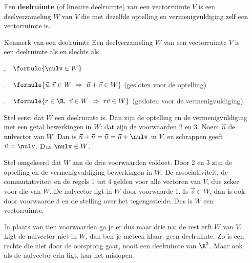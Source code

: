 \begin{theorie}
Een \textbf{\textcolor{accent}{deelruimte}} (of lineaire deelruimte) van een vectorruimte $V$ is een deelverzameling $W$ van $V$ die met dezelfde optelling en vermenigvuldiging zelf een vectorruimte is.

\begin{stelling}{Kenmerk van een deelruimte}
Een deelverzameling $W$ van een vectorruimte $V$ is een deelruimte als en slechts als

\vspace{1mm}
.\ \ $\formule{\nulv \in W}$

.\ \ $\formule{\vec u, \vec v \in W \ \Rightarrow \ \vec u + \vec v \in W}$ \hfill (gesloten voor de optelling)

.\ \ $\formule{r \in \R,\ \vec v \in W \ \Rightarrow \ r\vec v \in W}$ \hfill (gesloten voor de vermenigvuldiging)
\end{stelling}

\begin{bewijs}
Stel eerst dat $W$ een deelruimte is. Dan zijn de optelling en de vermenigvuldiging met een getal bewerkingen in $W$: dat zijn de voorwaarden 2 en 3. Noem $\vec n$ de nulvector van $W$. Dan is $\vec n + \vec n = \vec n = \vec n + \nulv$ in $V$, en schrappen geeft $\vec n = \nulv$. Dus $\nulv \in W$.

Stel omgekeerd dat $W$ aan de drie voorwaarden voldoet. Door 2 en 3 zijn de optelling en de vermenigvuldiging bewerkingen in $W$. De associativiteit, de commutativiteit en de regels 1 tot 4 gelden voor alle vectoren van $V$, dus zeker voor die van $W$. De nulvector ligt in $W$ door voorwaarde 1. Is $\vec v \in W$, dan is ook
door voorwaarde 3 en de stelling over het tegengestelde. Dus is $W$ een vectorruimte.
\end{bewijs}
\end{theorie}

In plaats van tien voorwaarden ga je er dus maar drie na: de rest erft $W$ van $V$. Ligt de nulvector niet in $W$, dan ben je meteen klaar: geen deelruimte. Zo is een rechte die niet door de oorsprong gaat, nooit een deelruimte van $\R^2$. Maar ook als de nulvector erin ligt, kan het mislopen.

